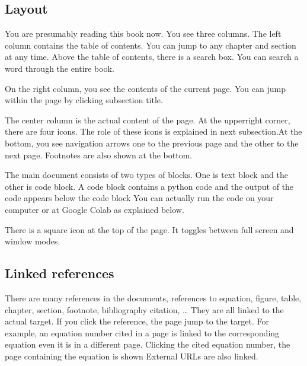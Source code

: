 \documentclass[letterpaper,10pt,english]{jupyterBook}
\begin{document}
\subsection{Layout}
\label{\detokenize{preparation/thisbook:layout}}
\sphinxAtStartPar
You are presumably reading this book now.  You see three columns.  The left column contains the table of contents.  You can jump to any chapter and section at any time.  Above the table of contents, there is a search box.  You can search a word through the entire book.

\sphinxAtStartPar
On the right column, you see the contents of the current page.  You can jump within the page by clicking subsection title.

\sphinxAtStartPar
The center column is the actual content of the page.  At the upper\sphinxhyphen{}right corner, there are four icons.  The role of these icons is explained in next subsection.At the bottom, you see navigation arrows one to the previous page and the other to the next page. Footnotes are also shown at the bottom.

\sphinxAtStartPar
The main document consists of two types of blocks.  One is text block and the other is code block. A code block contains a python code and the output of the code appears below the code block  You can actually run the code on your computer or at Google Colab as explained below.

\sphinxAtStartPar
There is a square icon at the top of the page.  It toggles between full screen and window modes.


\subsection{Linked references}
\label{\detokenize{preparation/thisbook:linked-references}}
\sphinxAtStartPar
There are many references in the documents, references to equation, figure, table, chapter, section, footnote, bibliography citation, …  They are all linked to the actual target.  If you click the reference, the page jump to the target. For example, an equation number cited in a page is linked to the corresponding equation even it is in a different page. Clicking the cited equation number, the page containing the equation is shown  External URLs are also linked.

\sphinxAtStartPar
{}
\end{document}
